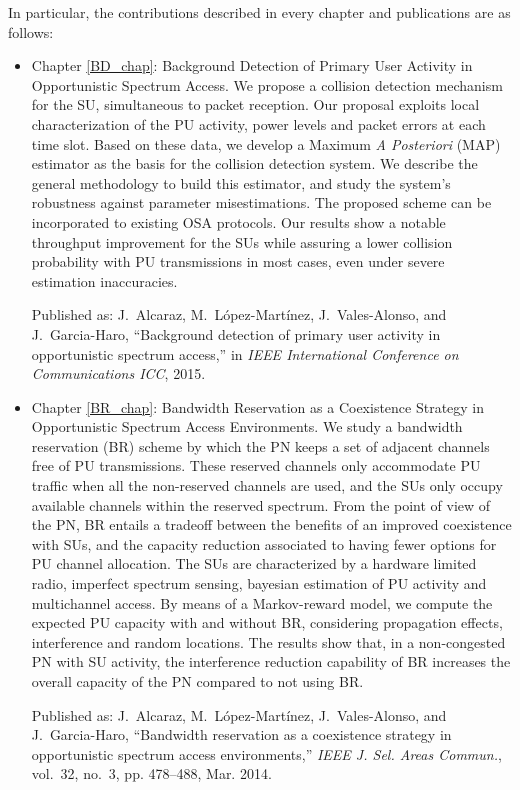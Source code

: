 In particular, the contributions described in every chapter and publications are as follows:
\begin{itemize}
\item Chapter \ref{BD_chap}: Background Detection of Primary User Activity in Opportunistic Spectrum Access. 
We propose a collision detection mechanism for the SU, simultaneous to packet reception. 
Our proposal exploits local characterization of the PU activity, power levels and packet errors at each time slot. 
Based on these data, we develop a Maximum \textit{A Posteriori} (MAP) estimator as the basis for the collision detection system. We describe the general methodology to build this estimator, and study the system's robustness against parameter misestimations. 
The proposed scheme can be incorporated to existing OSA protocols. 
Our results show a notable throughput improvement for the SUs while assuring a lower collision probability with PU transmissions in most cases, even under severe estimation inaccuracies. 

Published as:
J.~Alcaraz, M.~L\'{o}pez-Mart\'{i}nez, J.~Vales-Alonso, and J.~Garcia-Haro,
  ``Background detection of primary user activity in opportunistic spectrum
  access,'' in \emph{{IEEE} International Conference on Communications {ICC}},
  2015.

\item Chapter \ref{BR_chap}: Bandwidth Reservation as a Coexistence Strategy in Opportunistic Spectrum Access Environments. We study a bandwidth reservation (BR) scheme by which the PN keeps a set of adjacent channels free of PU transmissions. 
These reserved channels only accommodate PU traffic when all the non-reserved channels are used, and the SUs only occupy available channels within the reserved spectrum.
From the point of view of the PN, BR entails a tradeoff between the benefits of an improved coexistence with SUs, and the capacity reduction associated to having fewer options for PU channel allocation.
The SUs are characterized by a hardware limited radio, imperfect spectrum sensing, bayesian estimation of PU activity and multichannel access. 
By means of a Markov-reward model, we compute the expected PU capacity with and without BR, considering propagation effects, interference and random locations.
The results show that, in a non-congested PN with SU activity, the interference reduction capability of BR increases the overall capacity of the PN compared to not using BR.

Published as: J.~Alcaraz, M.~L\'{o}pez-Mart\'{i}nez, J.~Vales-Alonso, and J.~Garcia-Haro, ``Bandwidth reservation as a coexistence strategy in opportunistic
  spectrum access environments,'' \emph{{IEEE} J. Sel. Areas Commun.}, vol.~32,
  no.~3, pp. 478--488, Mar. 2014.


\end{itemize}
